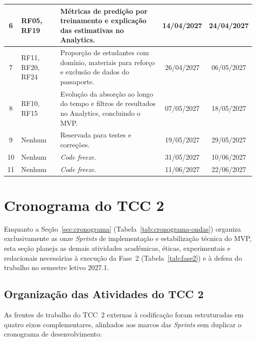 {\begin{longtable}{c>{\raggedright\arraybackslash}p{2.3cm}>{\raggedright\arraybackslash}p{6.3cm}cc}
\hline
6 & RF05, RF19 & Métricas de predição por treinamento e explicação das estimativas no Analytics. & 14/04/2027 & 24/04/2027 \\
\hline
7 & RF11, RF20, RF24 & Proporção de estudantes com domínio, materiais para reforço e exclusão de dados do passaporte. & 26/04/2027 & 06/05/2027 \\
\hline
8 & RF10, RF15 & Evolução da absorção ao longo do tempo e filtros de resultados no Analytics, concluindo o MVP. & 07/05/2027 & 18/05/2027 \\
\hline
9 & Nenhum & Reservada para testes e correções. & 19/05/2027 & 29/05/2027 \\
\hline
10 & Nenhum & \textit{Code freeze}. & 31/05/2027 & 10/06/2027 \\
\hline
11 & Nenhum & \textit{Code freeze}. & 11/06/2027 & 22/06/2027 \\
\hline
\end{longtable}
}


\section{Cronograma do TCC 2}
\label{sec:cronograma-tcc2}

Enquanto a Seção~\ref{sec:cronograma} (Tabela~\ref{tab:cronograma-ondas}) organiza exclusivamente as onze \textit{Sprints} de implementação e estabilização técnica do MVP, esta seção planeja as demais atividades acadêmicas, éticas, experimentais e redacionais necessárias à execução da Fase~2 (Tabela~\ref{tab:fase2}) e à defesa do trabalho no semestre letivo 2027.1.

\subsection{Organização das Atividades do TCC 2}
\label{subsec:etapas-tcc2}

As frentes de trabalho do TCC~2 externas à codificação foram estruturadas em quatro eixos complementares, alinhados aos marcos das \textit{Sprints} sem duplicar o cronograma de desenvolvimento:

